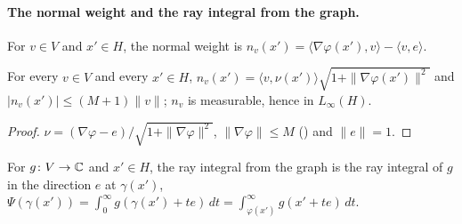 \paragraph{The normal weight and the ray integral from the graph.}

\begin{definition}
\label{def:normal-weight}
\leanok
{}
For $v \in V$ and $x' \in H$, the normal weight is
$n_v(x') = \langle \nabla\varphi(x'), v \rangle - \langle v, e \rangle$.
\end{definition}

\begin{lemma}
\label{lem:normal-weight}
\leanok
{}
For every $v \in V$ and every $x' \in H$,
$n_v(x') = \langle v, \nu(x') \rangle \sqrt{1 + \|\nabla\varphi(x')\|^2}$ and
$|n_v(x')| \leq (M + 1) \|v\|$; $n_v$ is measurable, hence in $L_\infty(H)$.
\end{lemma}

\begin{proof}
\leanok
$\nu = (\nabla\varphi - e)/\sqrt{1 + \|\nabla\varphi\|^2}$, $\|\nabla\varphi\| \leq M$
() and $\|e\| = 1$.
\end{proof}

\begin{definition}
\label{def:graph-ray-integral}
\leanok
{}
For $g \colon V \to \mathbb{C}$ and $x' \in H$, the ray integral from the graph is the ray integral of
$g$ in the direction $e$ at $\gamma(x')$,
$\Psi(\gamma(x')) = \int_0^\infty g(\gamma(x') + t e) \, dt
= \int_{\varphi(x')}^\infty g(x' + t e) \, dt$.
\end{definition}


